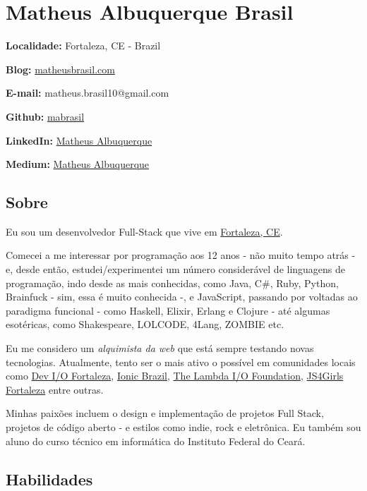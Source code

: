 \documentclass[]{article}
\date{}
\begin{document}
\section{Matheus Albuquerque Brasil}\label{matheus-albuquerque-brasil}

\textbf{Localidade:} Fortaleza, CE - Brazil

\textbf{Blog:} \href{http://matheusbrasil.com}{matheusbrasil.com}

\textbf{E-mail:} matheus.brasil10@gmail.com

\textbf{Github:} \href{https://github.com/mabrasil}{mabrasil}

\textbf{LinkedIn:}
\href{https://www.linkedin.com/in/matheusalbuquerque}{Matheus
Albuquerque}

\textbf{Medium:} \href{https://medium.com/@matheusalbuquerque}{Matheus
Albuquerque}

\subsection{Sobre}\label{sobre}

Eu sou um desenvolvedor Full-Stack que vive em
\href{http://pt.wikipedia.org/wiki/Fortaleza}{Fortaleza, CE}.

Comecei a me interessar por programação aos 12 anos - não muito tempo
atrás - e, desde então, estudei/experimentei um número considerável de
linguagens de programação, indo desde as mais conhecidas, como Java,
C\#, Ruby, Python, Brainfuck - sim, essa é muito conhecida -, e
JavaScript, passando por voltadas ao paradigma funcional - como Haskell,
Elixir, Erlang e Clojure - até algumas esotéricas, como Shakespeare,
LOLCODE, 4Lang, ZOMBIE etc.

Eu me considero um \emph{alquimista da web} que está sempre testando
novas tecnologias. Atualmente, tento ser o mais ativo o possível em
comunidades locais como
\href{https://www.facebook.com/groups/fortalezadevelopers/}{Dev I/O
Fortaleza}, \href{http://ionicbrazil.com/}{Ionic Brazil},
\href{https://github.com/lambda-io}{The Lambda I/O Foundation},
\href{http://js4girls-fortaleza.github.io/}{JS4Girls Fortaleza} entre
outras.

Minhas paixões incluem o design e implementação de projetos Full Stack,
projetos de código aberto - e estilos como indie, rock e eletrônica. Eu
também sou aluno do curso técnico em informática do Instituto Federal do
Ceará.

\subsection{Habilidades}\label{habilidades}
\end{document}
